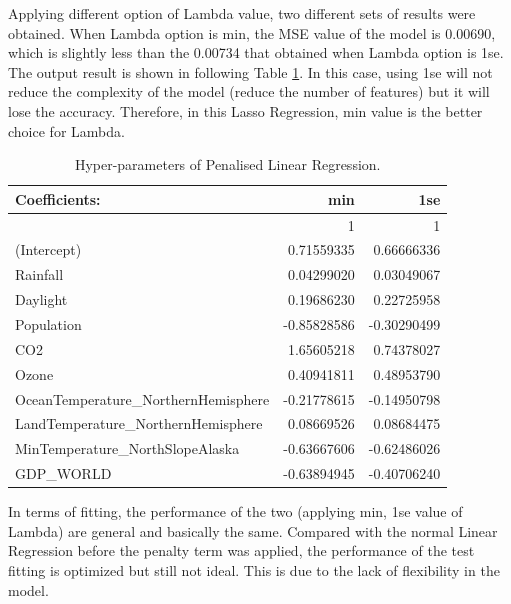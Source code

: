 Applying different option of Lambda value, two different sets of results were obtained. When Lambda option is min, the MSE value of the model is 0.00690, which is slightly less than the 0.00734 that obtained when Lambda option is 1se. The output result is shown in following Table \ref{4.2.2-PLR-para}. In this case, using 1se will not reduce the complexity of the model (reduce the number of features) but it will lose the accuracy. Therefore, in this Lasso Regression, min value is the better choice for Lambda.

\begin{table}[t]
  \centering
  \footnotesize
  \begin{tabular}{p{5.75cm} | r | r}
  \toprule
  Coefficients: & min & 1se\\ %
  \hline
    & 1 & 1\\
  (Intercept) & 0.71559335 & 0.66666336\\
  Rainfall & 0.04299020 & 0.03049067\\
  Daylight & 0.19686230 & 0.22725958\\
  Population & -0.85828586 & -0.30290499\\
  CO2 & 1.65605218 & 0.74378027\\
  Ozone & 0.40941811 & 0.48953790\\
  OceanTemperature\_NorthernHemisphere & -0.21778615 & -0.14950798\\
  LandTemperature\_NorthernHemisphere & 0.08669526 & 0.08684475\\
  MinTemperature\_NorthSlopeAlaska & -0.63667606 & -0.62486026\\
  GDP\_WORLD & -0.63894945 & -0.40706240\\
  \bottomrule
  \end{tabular}
  \caption{Hyper-parameters of Penalised Linear Regression.}
  \label{4.2.2-PLR-para}
\end{table}


In terms of fitting, the performance of the two (applying min, 1se value of Lambda) are general and basically the same. Compared with the normal Linear Regression before the penalty term was applied, the performance of the test fitting is optimized but still not ideal. This is due to the lack of flexibility in the model.



